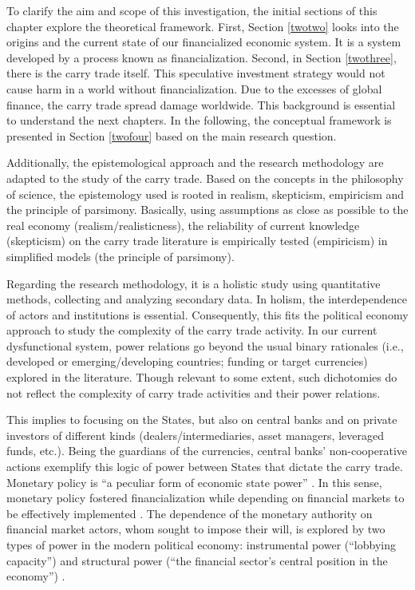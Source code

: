 \documentclass[a4paper, twoside]{templates/ociamthesis}
\begin{document}
To clarify the aim and scope of this investigation, the initial sections of this chapter explore the theoretical framework. First, Section \ref{twotwo} looks into the origins and the current state of our financialized economic system. It is a system developed by a process known as financialization. Second, in Section \ref{twothree}, there is the carry trade itself. This speculative investment strategy would not cause harm in a world without financialization. Due to the excesses of global finance, the carry trade spread damage worldwide. This background is essential to understand the next chapters. In the following, the conceptual framework is presented in Section \ref{twofour} based on the main research question.

Additionally, the epistemological approach and the research methodology are adapted to the study of the carry trade. Based on the concepts in the philosophy of science, the epistemology used is rooted in realism, skepticism, empiricism and the principle of parsimony. Basically, using assumptions as close as possible to the real economy (realism/realisticness), the reliability of current knowledge (skepticism) on the carry trade literature is empirically tested (empiricism) in simplified models (the principle of parsimony).

Regarding the research methodology, it is a holistic study using quantitative methods, collecting and analyzing secondary data. In holism, the interdependence of actors and institutions is essential. Consequently, this fits the political economy approach to study the complexity of the carry trade activity. In our current dysfunctional system, power relations go beyond the usual binary rationales (i.e., developed or emerging/developing countries; funding or target currencies) explored in the literature. Though relevant to some extent, such dichotomies do not reflect the complexity of carry trade activities and their power relations.

This implies to focusing on the States, but also on central banks and on private investors of different kinds (dealers/intermediaries, asset managers, leveraged funds, etc.). Being the guardians of the currencies, central banks' non-cooperative actions exemplify this logic of power between States that dictate the carry trade. Monetary policy is ``a peculiar form of economic state power'' \autocite[ 242]{braun2020}. In this sense, monetary policy fostered financialization while depending on financial markets to be effectively implemented \autocite{krippner2011,braun2018,braun2020a,walter2020}. The dependence of the monetary authority on financial market actors, whom sought to impose their will, is explored by two types of power in the modern political economy: instrumental power (``lobbying capacity'') and structural power (``the financial sector's central position in the economy'') \autocite[ 1]{braun2020a}.
\end{document}
